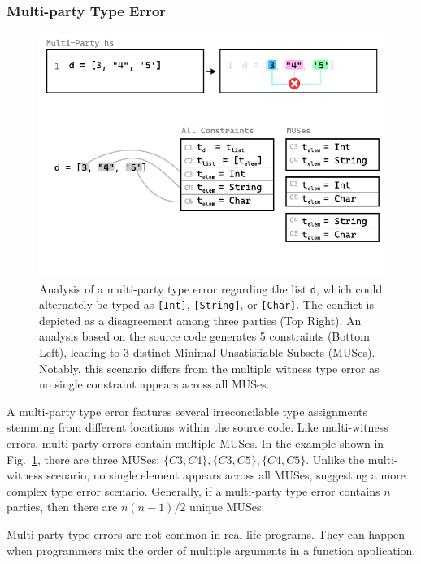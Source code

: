 \documentclass[pdflatex,lineno,sn-nature,Numbered]{sn-jnl}%
\begin{document}
\subsubsection*{Multi-party Type Error}

\begin{figure}[hbt]
  \centering
  \includegraphics[width=\linewidth]{images/Multi-Party-MUS}
  \caption{\label{fig:multi-party-2} Analysis of a multi-party type error regarding the list \texttt{d}, which could alternately be typed as \texttt{[Int]}, \texttt{[String]}, or \texttt{[Char]}. The conflict is depicted as a disagreement among three parties (Top Right). An analysis based on the source code generates 5 constraints (Bottom Left), leading to 3 distinct Minimal Unsatisfiable Subsets (MUSes). Notably, this scenario differs from the multiple witness type error as no single constraint appears across all MUSes.}
  \end{figure}

  A multi-party type error features several irreconcilable type assignments stemming from different locations within the source code. Like multi-witness errors, multi-party errors contain multiple MUSes. In the example shown in Fig.~\ref{fig:multi-party-2}, there are three MUSes: $\{C3, C4\}, \{C3, C5\}, \{C4, C5\}$. Unlike the multi-witness scenario, no single element appears across all MUSes, suggesting a more complex type error scenario. Generally, if a multi-party type error contains $n$ parties, then there are $n (n - 1) / 2$ unique MUSes.

Multi-party type errors are not common in real-life programs. They can happen when programmers mix the order of multiple arguments in a function application.  
  
\end{document}
